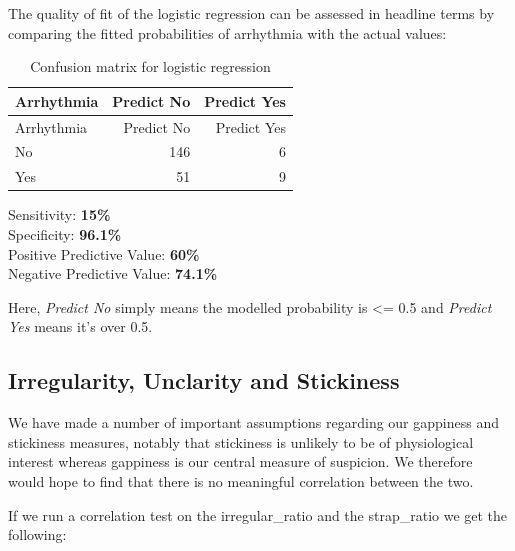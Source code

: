 \documentclass[
  letterpaper,
  DIV=11,
  numbers=noendperiod]{scrartcl}
\begin{document}
The quality of fit of the logistic regression can be assessed in
headline terms by comparing the fitted probabilities of arrhythmia with
the actual values:

\begin{longtable}[]{@{}lrr@{}}
\caption{Confusion matrix for logistic regression}\tabularnewline
\toprule\noalign{}
Arrhythmia & Predict No & Predict Yes \\
\midrule\noalign{}
\endfirsthead
\toprule\noalign{}
Arrhythmia & Predict No & Predict Yes \\
\midrule\noalign{}
\endhead
\bottomrule\noalign{}
\endlastfoot
No & 146 & 6 \\
Yes & 51 & 9 \\
\end{longtable}

Sensitivity: \textbf{15\%}\\
Specificity: \textbf{96.1\%}\\
Positive Predictive Value: \textbf{60\%}\\
Negative Predictive Value: \textbf{74.1\%}

Here, \emph{Predict No} simply means the modelled probability is
\textless= 0.5 and \emph{Predict Yes} means it's over 0.5.

\subsection{Irregularity, Unclarity and
Stickiness}\label{irregularity-unclarity-and-stickiness}

We have made a number of important assumptions regarding our gappiness
and stickiness measures, notably that stickiness is unlikely to be of
physiological interest whereas gappiness is our central measure of
suspicion. We therefore would hope to find that there is no meaningful
correlation between the two.

If we run a correlation test on the irregular\_ratio and the
strap\_ratio we get the following:
\end{document}
